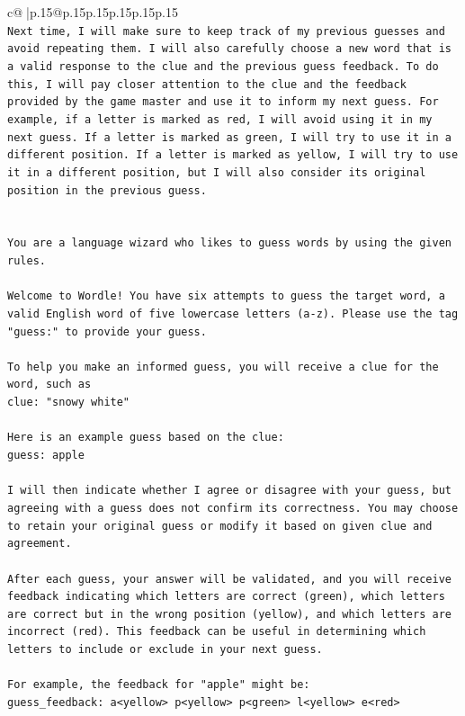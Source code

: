\documentclass{article}
\begin{document}
{\begin{supertabular}{c@{$\;$}|p{.15\linewidth}@{}p{.15\linewidth}p{.15\linewidth}p{.15\linewidth}p{.15\linewidth}p{.15\linewidth}}
{{{\\ 
\texttt{Next time, I will make sure to keep track of my previous guesses and avoid repeating them. I will also carefully choose a new word that is a valid response to the clue and the previous guess feedback. To do this, I will pay closer attention to the clue and the feedback provided by the game master and use it to inform my next guess. For example, if a letter is marked as red, I will avoid using it in my next guess. If a letter is marked as green, I will try to use it in a different position. If a letter is marked as yellow, I will try to use it in a different position, but I will also consider its original position in the previous guess.} \\
\\ 
\\ 
\texttt{You are a language wizard who likes to guess words by using the given rules.} \\
\\ 
\texttt{Welcome to Wordle! You have six attempts to guess the target word, a valid English word of five lowercase letters (a{-}z). Please use the tag "guess:" to provide your guess.} \\
\\ 
\texttt{To help you make an informed guess, you will receive a clue for the word, such as} \\
\texttt{clue: "snowy white"} \\
\\ 
\texttt{Here is an example guess based on the clue: } \\
\texttt{guess: apple} \\
\\ 
\texttt{I will then indicate whether I agree or disagree with your guess, but agreeing with a guess does not confirm its correctness. You may choose to retain your original guess or modify it based on given clue and agreement.} \\
\\ 
\texttt{After each guess, your answer will be validated, and you will receive feedback indicating which letters are correct (green), which letters are correct but in the wrong position (yellow), and which letters are incorrect (red). This feedback can be useful in determining which letters to include or exclude in your next guess.} \\
\\ 
\texttt{For example, the feedback for "apple" might be:} \\
\texttt{guess\_feedback: a<yellow> p<yellow> p<green> l<yellow> e<red>} \\
}}}
\end{supertabular}}
\end{document}
